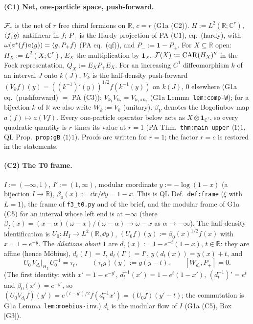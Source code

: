 \documentclass[11pt]{article}
\newcommand{\Pp}{P_+}\newcommand{\Pm}{P_-}\newcommand{\Stwo}{\mathfrak S_2}\newcommand{\Sone}{\mathfrak S_1}
\newcommand{\one}{\mathbf 1}\newcommand{\Om}{\Omega}\newcommand{\Gh}{\widehat G}\newcommand{\Dc}{\mathfrak D}
\newcommand{\Fr}{\cF_r}\newcommand{\Ft}{\mathcal F_{\rm m}}\newcommand{\Qt}{\widetilde Q}\newcommand{\Hil}{\mathcal H}
\theoremstyle{definition}\newtheorem{hypothesis}[theorem]{Hypothesis}
\begin{document}
\paragraph{(C1) Net, one-particle space, push-forward.}
$\Fr$ is the net of $r$ free chiral fermions on $\mathbb R$, $c=r$ (G1a (C2)).  $H:=L^2(\mathbb
R;\mathbb C^r)$, $\langle f,g\rangle$ antilinear in $f$; $\Pp$ is the Hardy projection of PA (C1), eq.~(hardy), with
$\omega(a^*(f)a(g))=\ip g{\Pp f}$ (PA eq.~(qf)), and $\Pm:=\one-\Pp$.  For $X\subseteq\mathbb R$ open:
$H_X:=L^2(X;\mathbb C^r)$, $E_X$ the multiplication by $\one_X$, $\mathcal F(X):=\mathrm{CAR}(H_X)''$ in the
Fock representation, $Q_X:=E_X\Pp E_X$.  For an increasing $C^1$ diffeomorphism $k$ of an interval $J$
onto $k(J)$, $V_k$ is the half-density push-forward $(V_kf)(y)=((k^{-1})'(y))^{1/2}f(k^{-1}(y))$ on
$k(J)$, $0$ elsewhere (G1a eq.~(pushforward) $=$ PA (C3)); $V_{k_1}V_{k_2}=V_{k_1\circ k_2}$ (G1a
Lemma~\texttt{lem:comp-W}); for a bijection $k$ of $\mathbb R$ we also write $W_k:=V_k$ (unitary).
$\beta_V$ denotes the Bogoliubov map $a(f)\mapsto a(Vf)$.  Every one-particle operator below acts as
$X\otimes\one_{\mathbb C^r}$, so every quadratic quantity is $r$ times its value at $r=1$ (PA
Thm.~\texttt{thm:main-upper} $\langle1\rangle1$, QL Prop.~\texttt{prop:gB} $\langle1\rangle1$).  Proofs
are written for $r=1$; the factor $r=c$ is restored in the statements.

\paragraph{(C2) The T0 frame.}
$I:=(-\infty,1)$, $I':=(1,\infty)$, modular coordinate $y:=-\log(1-x)$ (a bijection $I\to\mathbb R$),
$\beta_0(x):=\dd x/\dd y=1-x$.  This is QL Def.~\texttt{def:frame} ($\xi$ with $L=1$), the frame of
\texttt{f3\_t0.py} and of the brief, and the modular frame of G1a (C5) for an interval whose left end is
at $-\infty$ (there $\beta_I(x)=(x-\alpha)(\omega-x)/(\omega-\alpha)\to\omega-x$ as $\alpha\to-\infty$).
The half-density identification is $U_0:H_I\to L^2(\mathbb R,\dd y)$, $(U_0f)(y):=\beta_0(x)^{1/2}f(x)$
with $x=1-e^{-y}$.  The \emph{dilations about $1$} are $d_t(x):=1-e^{-t}(1-x)$, $t\in\mathbb R$: they
are affine (hence M\"obius), $d_t(I)=I$, $d_t(I')=I'$, $y(d_t(x))=y(x)+t$, and
\begin{equation}\label{eq:transl}
 U_0\,V_{d_t}|_{H_I}\,U_0^{-1}=\tau_t,\qquad (\tau_tg)(y):=g(y-t),\qquad [W_{d_t},\Pp]=0 .
\end{equation}
(The first identity: with $x'=1-e^{-y'}$, $d_t^{-1}(x')=1-e^t(1-x')$, $(d_t^{-1})'=e^t$ and
$\beta_0(x')=e^{-y'}$, so $(U_0V_{d_t}f)(y')=e^{(t-y')/2}f(d_t^{-1}x')=(U_0f)(y'-t)$; the commutation
is G1a Lemma~\texttt{lem:moebius-inv}.)  $d_t$ is the modular flow of $I$ (G1a (C5), Box [G3]).
\end{document}
